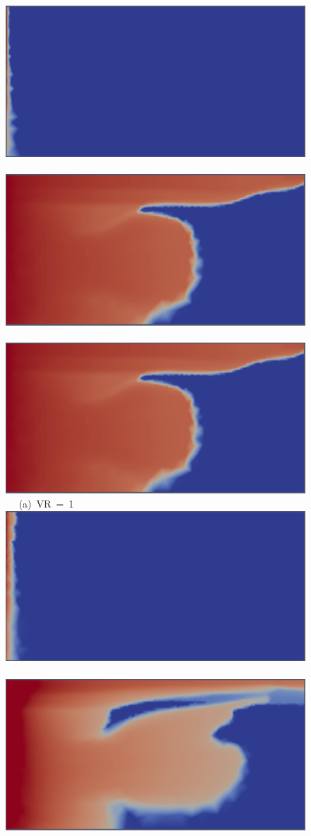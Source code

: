 \begin{landscape}
  \begin{figure}[ht]
    \vbox{ 
      \hbox{\includegraphics[width=.55\textwidth]{./Pics1/mr1_fixed/mr1_fixed_100_2.pdf}
            \includegraphics[width=.55\textwidth]{./Pics1/mr1_fixed/mr1_fixed_middle_1.pdf} 
            \includegraphics[width=.55\textwidth]{./Pics1/mr1_fixed/mr1_fixed_middle_1.pdf} }
      \hbox{\hspace{10cm} (a) VR = 1}
      \vspace{1cm}
      \hbox{\includegraphics[width=.55\textwidth]{./Pics1/mr10_fixed/mr10_fixed_100_1.pdf}
            \includegraphics[width=.55\textwidth]{./Pics1/mr10_fixed/mr10_fixed_middle_1.pdf}
}}
\end{figure}
\end{landscape}
